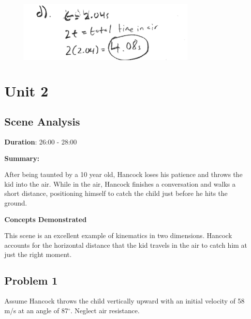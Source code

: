 \documentclass[a4paper,12pt]{article}
\begin{document}
\begin{figure}[H]
    \centering
    \includegraphics[width=0.8\textwidth]{U1_P2_D} %
\end{figure}

\newpage


\section{Unit 2}

\vspace{-0.5cm}
\singlespacing

\subsection{Scene Analysis}

\textbf{Duration}: 26:00 - 28:00

\vspace{0.3cm}
\noindent\textbf{Summary:} \par
After being taunted by a 10 year old, Hancock loses his patience and throws the kid into the air. While in the air, Hancock finishes a conversation and walks a short distance, positioning himself to catch the child just before he hits the ground.
\par


\vspace{0.3cm}
\noindent\textbf{Concepts Demonstrated} \par
This scene is an excellent example of kinematics in two dimensions. Hancock accounts for the horizontal distance that the kid travels in the air to catch him at just the right moment.  


\subsection{Problem 1}
Assume Hancock throws the child vertically upward with an initial velocity of 58 m/s at an angle of 87$^\circ$. Neglect air resistance. \\
\end{document}
